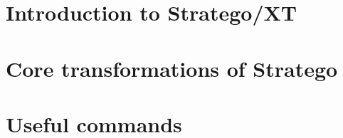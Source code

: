 \chapter{Introduction to Stratego/XT}

\chapter{Core transformations of Stratego}

\chapter{Useful commands}

